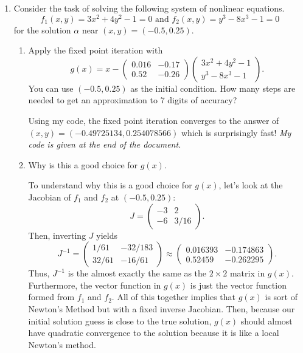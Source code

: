 \documentclass[a4paper,12pt]{article}
\newcommand{\pmat}[1]{\begin{pmatrix} #1 \end{pmatrix}}
\begin{document}
\begin{enumerate}[label = \arabic*)]
	\item Consider the task of solving the following system of nonlinear equations.
	\[
		f_1(x,y) = 3x^2 + 4y^2 - 1 = 0 \text{ and } f_2(x,y) = y^3 - 8x^3 - 1 = 0
	\]
	for the solution $ \alpha $ near $ (x,y) = (-0.5, 0.25) $.
	\begin{enumerate}[label = (\alph*)]
		\item Apply the fixed point iteration with
		\[
			g(x) = x - \pmat{0.016 & -0.17 \\ 0.52 & -0.26} \pmat{3x^2 + 4y^2 - 1 \\ y^3 - 8x^3 - 1}.
		\]
		You can use $ (-0.5, 0.25) $ as the initial condition. How many steps are needed to get an approximation to 7 digits of accuracy?
		
		Using my code, the fixed point iteration converges to the answer of $ (x, y) = (-0.49725134, 0.254078566) $ which is surprisingly fast! \emph{My code is given at the end of the document.}
		
		\item Why is this a good choice for $ g(x) $.
		
		To understand why this is a good choice for $ g(x) $, let's look at the Jacobian of $ f_1 $ and $ f_2 $ at $ (-0.5, 0.25) $:
		\[
			J = \pmat{-3 & 2 \\ -6 & 3/16}.
		\]
		Then, inverting $ J $ yields
		\[
			J^{-1} = \pmat{1/61 & -32/183 \\ 32/61 & -16/61} \approx \pmat{0.016393 & -0.174863 \\ 0.52459 & -0.262295}.
		\]
		Thus, $ J^{-1} $ is the almost exactly the same as the $ 2 \times 2 $ matrix in $ g(x) $. Furthermore, the vector function in $ g(x) $ is just the vector function formed from $ f_1 $ and $ f_2 $. All of this together implies that $ g(x) $ is sort of Newton's Method but with a fixed inverse Jacobian. Then, because our initial solution guess is close to the true solution, $ g(x) $ should almost have quadratic convergence to the solution because it is like a local Newton's method.
	\end{enumerate}
\end{enumerate}
\end{document}
